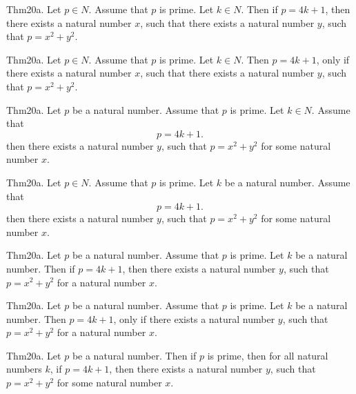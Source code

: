 \documentclass{article}
\begin{document}
Thm20a. Let $p \in N$. Assume that $p$ is prime. Let $k \in N$. Then if $p = 4 k + 1$, then there exists a natural number $x$, such that there exists a natural number $y$, such that $p = x ^{ 2}+ y ^{ 2}$.

Thm20a. Let $p \in N$. Assume that $p$ is prime. Let $k \in N$. Then $p = 4 k + 1$, only if there exists a natural number $x$, such that there exists a natural number $y$, such that $p = x ^{ 2}+ y ^{ 2}$.

Thm20a. Let $p$ be a natural number. Assume that $p$ is prime. Let $k \in N$. Assume that $$p = 4 k + 1.$$ then there exists a natural number $y$, such that $p = x ^{ 2}+ y ^{ 2}$ for some natural number $x$.

Thm20a. Let $p \in N$. Assume that $p$ is prime. Let $k$ be a natural number. Assume that $$p = 4 k + 1.$$ then there exists a natural number $y$, such that $p = x ^{ 2}+ y ^{ 2}$ for some natural number $x$.

Thm20a. Let $p$ be a natural number. Assume that $p$ is prime. Let $k$ be a natural number. Then if $p = 4 k + 1$, then there exists a natural number $y$, such that $p = x ^{ 2}+ y ^{ 2}$ for a natural number $x$.

Thm20a. Let $p$ be a natural number. Assume that $p$ is prime. Let $k$ be a natural number. Then $p = 4 k + 1$, only if there exists a natural number $y$, such that $p = x ^{ 2}+ y ^{ 2}$ for a natural number $x$.

Thm20a. Let $p$ be a natural number. Then if $p$ is prime, then for all natural numbers $k$, if $p = 4 k + 1$, then there exists a natural number $y$, such that $p = x ^{ 2}+ y ^{ 2}$ for some natural number $x$.
\end{document}
